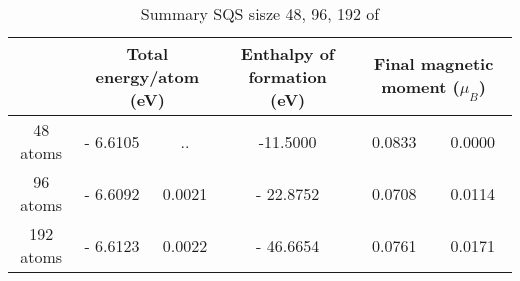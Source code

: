 \begin{table}[H]
\hskip-2cm\begin{tabular}{@{}cccccc@{}}
\toprule
       & \multicolumn{2}{c}{Total energy/atom (eV)} & Enthalpy of formation (eV) & \multicolumn{2}{c}{Final magnetic moment ($\mu_B$)} \\ \midrule
48 atoms & - 6.6105 & .. & -11.5000 & 0.0833 & 0.0000    \\
96 atoms & - 6.6092  & 0.0021 & - 22.8752  & 0.0708  & 0.0114     \\
192 atoms & - 6.6123  & 0.0022 & - 46.6654 & 0.0761 & 0.0171     \\ \bottomrule
\end{tabular}
\caption{Summary SQS sisze 48, 96, 192 of }
\end{table}

